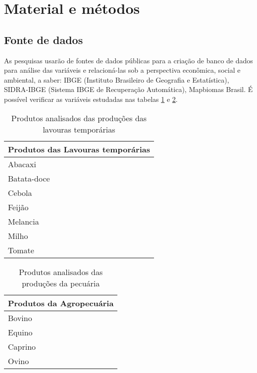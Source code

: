 

\section{Material e métodos}


\subsection{Fonte de dados}

As pesquisas usarão de fontes de dados públicas para a criação de banco de dados para análise das variáveis e relacioná-las sob a perspectiva
econômica, social e ambiental, a saber: IBGE (Instituto Brasileiro de Geografia e Estatística), SIDRA-IBGE (Sistema IBGE de Recuperação Automática), Mapbiomas Brasil. É possível verificar as variáveis estudadas nas tabelas \ref{tab:produto_analisados-lavtemp} e \ref{tab:produto_analisados-pecuaria}.

\begin{center}
    \begin{table}[!htb]
        \centering
        \begin{tabular}{|p{}|}
        \hline
        \textbf{Produtos das Lavouras temporárias} \\ \hline
           Abacaxi \\ 
            \hline
           Batata-doce \\ 
            \hline
           Cebola \\ 
            \hline
           Feijão \\
            \hline
           Melancia \\
            \hline
           Milho \\
            \hline
           Tomate \\
            \hline  
            \end{tabular}
        \caption{Produtos analisados das produções das lavouras temporárias}
        \label{tab:produto_analisados-lavtemp}
    \end{table}
\end{center}


\begin{center}
    \begin{table}[!htb]
        \centering
        \begin{tabular}{|p{}|}
        \hline
        \textbf{Produtos da Agropecuária} \\ 
            \hline  
            Bovino \\
            \hline  
            Equino \\
            \hline  
            Caprino \\
            \hline  
            Ovino \\
            \hline  
            \end{tabular}
        \caption{Produtos analisados das produções da pecuária}
        \label{tab:produto_analisados-pecuaria}
    \end{table}
\end{center}

